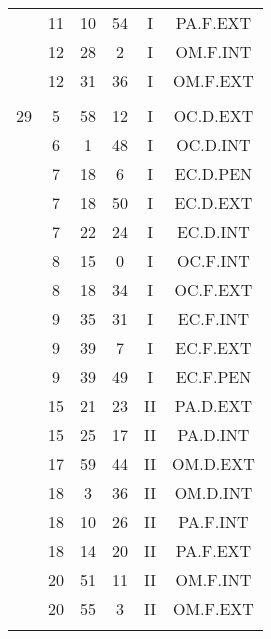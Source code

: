 \documentclass[12pt, a4paper]{article}
\begin{document}
\begin{multicols}{3}
{\begin{tabular}{c c c c c c}
	 	 	 	 & 11 & 10 & 54 & I & PA.F.EXT\\%
	 	 	 	 & 12 & 28 & 2 & I & OM.F.INT\\%
	 	 	 	 & 12 & 31 & 36 & I & OM.F.EXT\\%
	 	 	 	 & & & & & \\%
	 	 	 	29 & 5 & 58 & 12 & I & OC.D.EXT\\%
	 	 	 	 & 6 & 1 & 48 & I & OC.D.INT\\%
	 	 	 	 & 7 & 18 & 6 & I & EC.D.PEN\\%
	 	 	 	 & 7 & 18 & 50 & I & EC.D.EXT\\%
	 	 	 	 & 7 & 22 & 24 & I & EC.D.INT\\%
	 	 	 	 & 8 & 15 & 0 & I & OC.F.INT\\%
	 	 	 	 & 8 & 18 & 34 & I & OC.F.EXT\\%
	 	 	 	 & 9 & 35 & 31 & I & EC.F.INT\\%
	 	 	 	 & 9 & 39 & 7 & I & EC.F.EXT\\%
	 	 	 	 & 9 & 39 & 49 & I & EC.F.PEN\\%
	 	 	 	 & 15 & 21 & 23 & II & PA.D.EXT\\%
	 	 	 	 & 15 & 25 & 17 & II & PA.D.INT\\%
	 	 	 	 & 17 & 59 & 44 & II & OM.D.EXT\\%
	 	 	 	 & 18 & 3 & 36 & II & OM.D.INT\\%
	 	 	 	 & 18 & 10 & 26 & II & PA.F.INT\\%
	 	 	 	 & 18 & 14 & 20 & II & PA.F.EXT\\%
	 	 	 	 & 20 & 51 & 11 & II & OM.F.INT\\%
	 	 	 	 & 20 & 55 & 3 & II & OM.F.EXT\\%
	 	 	 	 & & & & & \\%

\end{tabular}}
\end{multicols}
\end{document}
